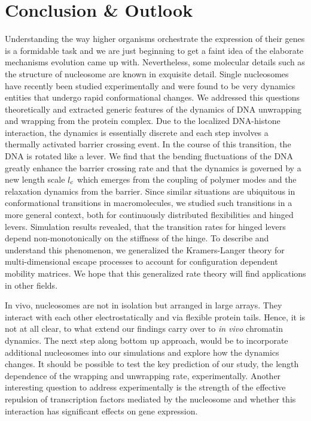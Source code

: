 \section{Conclusion \& Outlook}
Understanding the way higher organisms orchestrate the expression of their genes is a formidable task and
we are just beginning to get a faint idea of the elaborate mechanisms evolution came up with. 
Nevertheless, some molecular details such as the structure of nucleosome are known in exquisite
detail. Single nucleosomes have recently been studied experimentally and were found to
be very dynamics entities that undergo rapid conformational changes. 
We addressed this questions theoretically and extracted generic features of the dynamics of 
DNA unwrapping and wrapping from the protein complex. Due to the localized DNA-histone interaction,
the dynamics is essentially discrete and each step involves a thermally activated barrier crossing event. 
In the course of this transition, the DNA is rotated like a lever.
We find that the bending fluctuations of the DNA greatly enhance the barrier crossing rate and that the
dynamics is governed by a new length scale ${l_c}$ which emerges from the coupling of polymer modes
and the relaxation dynamics from the barrier.  Since similar
situations are ubiquitous in conformational transitions in macromolecules, we studied such 
transitions in a more general context, both for continuously distributed
flexibilities and hinged levers. Simulation results revealed, that the transition rates for hinged levers
depend non-monotonically on the stiffness of the hinge. To describe and understand this phenomenon, 
we generalized the Kramers-Langer theory for multi-dimensional escape processes to 
account for configuration dependent mobility matrices. We hope that this generalized rate theory will
find applications in other fields. 

In vivo, nucleosomes are not in isolation but arranged in large arrays. They interact with each other 
electrostatically and via flexible protein tails. Hence, it is not at all clear, to what extend our findings
carry over to \emph{in vivo} chromatin dynamics. The next step along bottom up approach, would be
to incorporate additional nucleosomes into our simulations and explore how the dynamics changes. 
It should be possible to test the key prediction of our study, the length dependence of the wrapping 
and unwrapping rate, experimentally. Another interesting question to address experimentally is
the strength of the effective repulsion of transcription factors mediated by the nucleosome
and whether this interaction has significant effects on gene expression.

